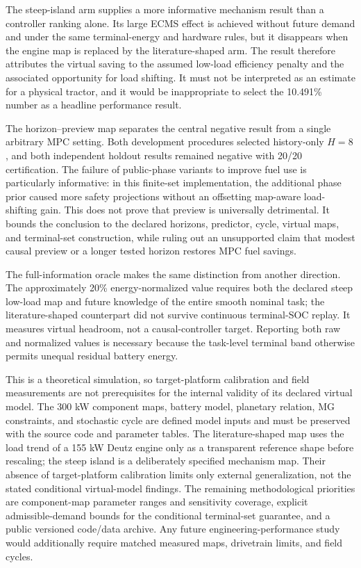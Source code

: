 \documentclass[agriengineering,article,submit,moreauthors]{Definitions/mdpi}
\begin{document}
The steep-island arm supplies a more informative mechanism result than a controller ranking alone. Its large ECMS effect is achieved without future demand and under the same terminal-energy and hardware rules, but it disappears when the engine map is replaced by the literature-shaped arm. The result therefore attributes the virtual saving to the assumed low-load efficiency penalty and the associated opportunity for load shifting. It must not be interpreted as an estimate for a physical tractor, and it would be inappropriate to select the 10.491\% number as a headline performance result.

The horizon--preview map separates the central negative result from a single arbitrary MPC setting. Both development procedures selected history-only $H=8$, and both independent holdout results remained negative with 20/20 certification. The failure of public-phase variants to improve fuel use is particularly informative: in this finite-set implementation, the additional phase prior caused more safety projections without an offsetting map-aware load-shifting gain. This does not prove that preview is universally detrimental. It bounds the conclusion to the declared horizons, predictor, cycle, virtual maps, and terminal-set construction, while ruling out an unsupported claim that modest causal preview or a longer tested horizon restores MPC fuel savings.

The full-information oracle makes the same distinction from another direction. The approximately 20\% energy-normalized value requires both the declared steep low-load map and future knowledge of the entire smooth nominal task; the literature-shaped counterpart did not survive continuous terminal-SOC replay. It measures virtual headroom, not a causal-controller target. Reporting both raw and normalized values is necessary because the task-level terminal band otherwise permits unequal residual battery energy.

This is a theoretical simulation, so target-platform calibration and field measurements are not prerequisites for the internal validity of its declared virtual model. The 300 kW component maps, battery model, planetary relation, MG constraints, and stochastic cycle are defined model inputs and must be preserved with the source code and parameter tables. The literature-shaped map uses the load trend of a 155 kW Deutz engine only as a transparent reference shape before rescaling; the steep island is a deliberately specified mechanism map. Their absence of target-platform calibration limits only external generalization, not the stated conditional virtual-model findings. The remaining methodological priorities are component-map parameter ranges and sensitivity coverage, explicit admissible-demand bounds for the conditional terminal-set guarantee, and a public versioned code/data archive. Any future engineering-performance study would additionally require matched measured maps, drivetrain limits, and field cycles.
\end{document}

